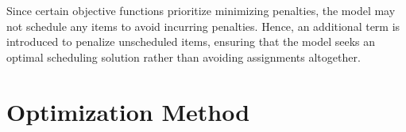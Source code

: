 \documentclass[12pt]{article}
\begin{document}

Since certain objective functions prioritize minimizing penalties, the model may not schedule any items to avoid incurring penalties. Hence, an additional term is introduced to penalize unscheduled items, ensuring that the model seeks an optimal scheduling solution rather than avoiding assignments altogether.




\section*{Optimization Method}

\end{document}
